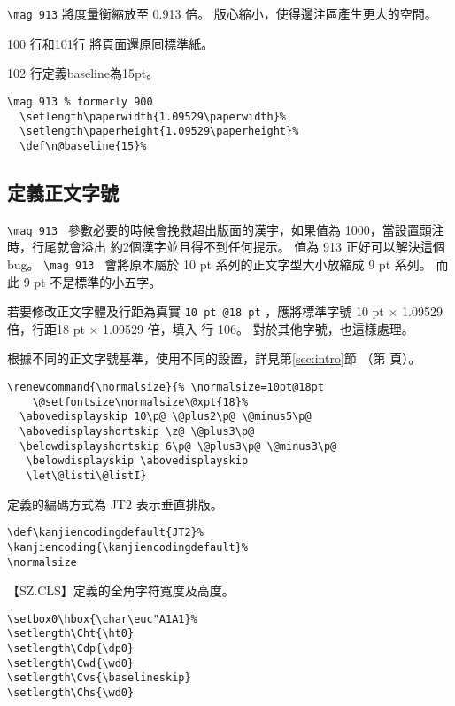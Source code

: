 \par \verb+\mag 913+ 將度量衡縮放至 0.913 倍。 
版心縮小，使得邊注區產生更大的空間。
\par 100 行和101行 將頁面還原囘標準紙。
\par 102 行定義baseline為15pt。
\begin{lstlisting}[firstnumber=99]
  \mag 913 % formerly 900
  \setlength\paperwidth{1.09529\paperwidth}%
  \setlength\paperheight{1.09529\paperheight}%
  \def\n@baseline{15}%
\end{lstlisting}

\subsection{定義正文字號}

\par {} \verb+\mag 913 + 
參數必要的時候會挽救超出版面的漢字，如果值為 1000，當設置頭注時，行尾就會溢出
約2個漢字並且得不到任何提示。 值為 913 正好可以解決這個 bug。 
\verb+\mag 913 + 會將原本屬於 10 pt 系列的正文字型大小放縮成 9 pt 系列。 
而此 9 pt 不是標準的小五字。

\par 若要修改正文字體及行距為真實 \verb+10 pt @18 pt+ ，應將標準字號
10 pt × 1.09529 倍，行距18 pt × 1.09529 倍，填入 行 106。
對於其他字號，也這樣處理。
\par 根據不同的正文字號基準，使用不同的設置，詳見第\ref{sec:intro}節
（第\pageref{sec:intro} 頁）。
\clearpage
\begin{lstlisting}[firstnumber=105]
\renewcommand{\normalsize}{% \normalsize=10pt@18pt
    \@setfontsize\normalsize\@xpt{18}%
  \abovedisplayskip 10\p@ \@plus2\p@ \@minus5\p@
  \abovedisplayshortskip \z@ \@plus3\p@
  \belowdisplayshortskip 6\p@ \@plus3\p@ \@minus3\p@
   \belowdisplayskip \abovedisplayskip
   \let\@listi\@listI}
\end{lstlisting}

\par 定義的編碼方式為 JT2 表示垂直排版。
\begin{lstlisting}[firstnumber=113]
\def\kanjiencodingdefault{JT2}%
\kanjiencoding{\kanjiencodingdefault}%
\normalsize
\end{lstlisting}

\par 【SZ.CLS】定義的全角字符寬度及高度。
\begin{lstlisting}[firstnumber=116]
\setbox0\hbox{\char\euc"A1A1}%
\setlength\Cht{\ht0}
\setlength\Cdp{\dp0}
\setlength\Cwd{\wd0}
\setlength\Cvs{\baselineskip}
\setlength\Chs{\wd0}
\end{lstlisting}

